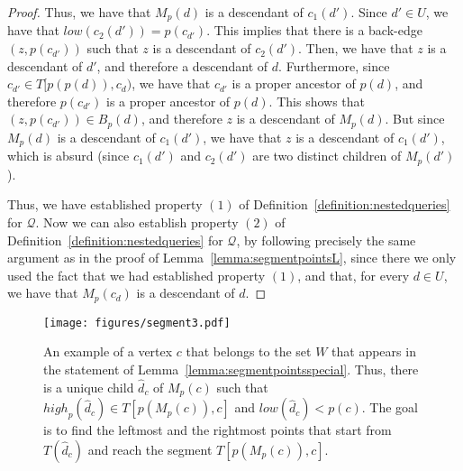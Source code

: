 \documentclass[11pt,a4paper]{article}
\begin{document}
\begin{proof}
Thus, we have that $M_p(d)$ is a descendant of $c_1(d')$. Since $d'\in U$, we have that $\mathit{low}(c_2(d'))=p(c_{d'})$. This implies that there is a back-edge $(z,p(c_{d'}))$ such that $z$ is a descendant of $c_2(d')$. Then, we have that $z$ is a descendant of $d'$, and therefore a descendant of $d$. Furthermore, since $c_{d'}\in T[p(p(d)),c_d)$, we have that $c_{d'}$ is a proper ancestor of $p(d)$, and therefore $p(c_{d'})$ is a proper ancestor of $p(d)$. This shows that $(z,p(c_{d'}))\in B_p(d)$, and therefore $z$ is a descendant of $M_p(d)$. But since $M_p(d)$ is a descendant of $c_1(d')$, we have that $z$ is a descendant of $c_1(d')$, which is absurd (since $c_1(d')$ and $c_2(d')$ are two distinct children of $M_p(d')$). 

Thus, we have established property $(1)$ of Definition~\ref{definition:nestedqueries} for $\mathcal{Q}$. Now we can also establish property $(2)$ of Definition~\ref{definition:nestedqueries} for $\mathcal{Q}$, by following precisely the same argument as in the proof of Lemma~\ref{lemma:segmentpointsL}, since there we only used the fact that we had established property $(1)$, and that, for every $d\in U$, we have that $M_p(c_d)$ is a descendant of $d$.
\end{proof}


\begin{figure}[h!]\centering
\texttt{[image: figures/segment3.pdf]}
\caption{\small{An example of a vertex $c$ that belongs to the set $W$ that appears in the statement of Lemma~\ref{lemma:segmentpointsspecial}. Thus, there is a unique child $\hat{d}_c$ of $M_p(c)$ such that $\mathit{high}_p(\hat{d}_c)\in T[p(M_p(c)),c]$ and $\mathit{low}(\hat{d}_c)<p(c)$. The goal is to find the leftmost and the rightmost points that start from $T(\hat{d}_c)$ and reach the segment $T[p(M_p(c)),c]$.}}\label{figure:segment3}
\end{figure}
\end{document}
